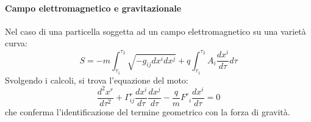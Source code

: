 \paragraph{Campo elettromagnetico e gravitazionale}

Nel caso di una particella soggetta ad un campo elettromagnetico su una varietà curva:
\begin{equation}
	S = -m \int_{\tau_1}^{\tau_2} \sqrt{- g_{ij} dx^i dx^j} + q \int_{\tau_1}^{\tau_2} A_i \frac{dx^i}{d\tau} d\tau
	\label{eq:5.13}
\end{equation}
Svolgendo i calcoli, si trova l'equazione del moto:
\begin{equation}
	\frac{d^2 x^r}{d\tau^2} + \Gamma^r_{ij} \frac{dx^i}{d\tau} \frac{dx^j}{d\tau} - \frac{q}{m} F^r_{\,\,\,i} \frac{dx^i}{d\tau} = 0
	\label{eq:5.14}
\end{equation}
che conferma l'identificazione del termine geometrico con la forza di gravità.










